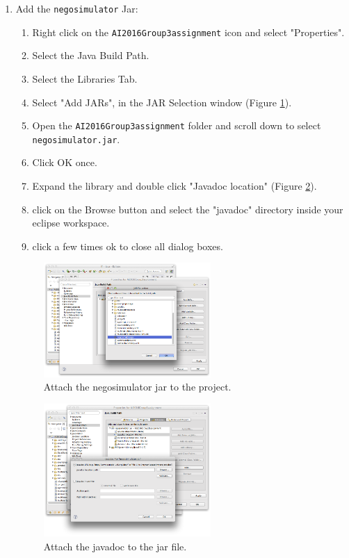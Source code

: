 \documentclass[]{article}
\begin{document}
\begin{enumerate}
\FloatBarrier

\item{Add the \texttt{negosimulator} Jar:
	\begin{enumerate}
		\item Right click on the \texttt{AI2016Group3assignment} icon and select "Properties".
		\item Select the Java Build Path.
		\item Select the Libraries Tab.
		\item Select "Add JARs", in the JAR Selection window (Figure \ref{fig:run-genius-3}).
		\item Open the \texttt{AI2016Group3assignment} folder and scroll down to select \texttt{negosimulator.jar}.
		\item Click OK once.
		
		\item Expand the library and double click "Javadoc location" (Figure \ref{fig:attachjavadoc}).
		\item click on the Browse button and select the "javadoc" directory inside your eclipse workspace.
		\item click a few times ok to close all dialog boxes.

	\end{enumerate}
	}
	
\begin{figure}[h!]
	\centering
		\includegraphics[width=0.6\textwidth]{media/selectjar.png}
		\caption{Attach the negosimulator jar to the project.}
	\label{fig:run-genius-3}
\end{figure}



\begin{figure}[h!]
	\centering
		\includegraphics[width=0.6\textwidth]{media/setjavadoc.png}
		\caption{Attach the javadoc to the jar file.}
	\label{fig:attachjavadoc}
\end{figure}


\end{enumerate}
\end{document}
